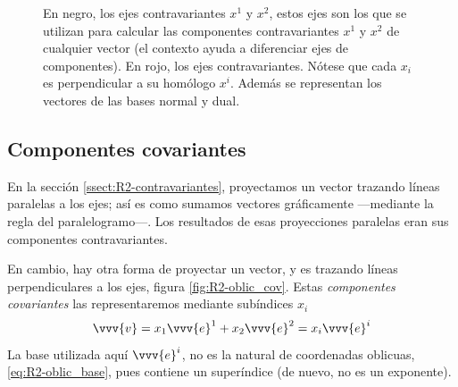 \begin{figure}[ht]
  \caption{En negro, los ejes contravariantes $x^1$ y $x^2$, estos ejes son los que se
    utilizan para calcular las componentes contravariantes $x^1$ y $x^2$ de cualquier
    vector (el contexto ayuda a diferenciar ejes de componentes).
    En rojo, los ejes contravariantes. Nótese que cada $x_i$ es perpendicular a su
    homólogo $x^i$. Además se representan los vectores de las bases normal y dual.}
  \label{fig:R2-oblic_ejes_ctv_cov}
\end{figure}


\subsection{Componentes covariantes}
En la sección \ref{ssect:R2-contravariantes}, proyectamos un vector trazando líneas
paralelas a los ejes; así es como sumamos vectores gráficamente ---mediante la regla del
paralelogramo---. Los resultados de esas proyecciones paralelas eran sus componentes
contravariantes.

En cambio, hay otra forma de proyectar un vector, y es trazando líneas perpendiculares a
los ejes, figura \ref{fig:R2-oblic_cov}.
Estas \emph{componentes covariantes} las representaremos mediante subíndices $x_i$
\begin{equation}
  \vvv{v} = x_1\vvv{e}^1 + x_2\vvv{e}^2 = x_i \vvv{e}^i
\end{equation}
La base utilizada aquí $\vvv{e}^i$, no es la natural de coordenadas oblicuas,
\eqref{eq:R2-oblic_base}, pues contiene un superíndice (de nuevo, no es un exponente).

